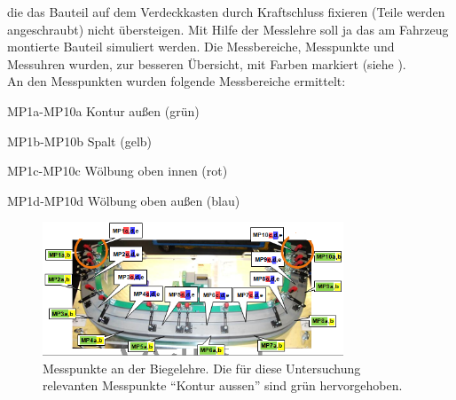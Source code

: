 \documentclass[12pt,a4paper,parskip,twoside,BCOR5mm,headsepline]{scrartcl}
\begin{document}
 
  die das Bauteil auf dem Verdeckkasten durch Kraftschluss fixieren (Teile werden angeschraubt) nicht übersteigen. Mit Hilfe der Messlehre soll ja das am Fahrzeug montierte Bauteil simuliert werden.  Die Messbereiche, Messpunkte und Messuhren wurden, zur besseren Übersicht, mit Farben markiert (siehe ).  \\
 An den Messpunkten wurden folgende Messbereiche ermittelt:
 \begin{description*}
 \item[MP1a-MP10a] Kontur außen (grün)
 \item[MP1b-MP10b] Spalt (gelb)
 \item[MP1c-MP10c] Wölbung oben innen (rot)
 \item[MP1d-MP10d] Wölbung oben außen (blau)
 \end{description*}
\begin{figure}[hbtp]
\centering
\includegraphics[width=0.8\textwidth]{messpunktevdkda3}
\caption{Messpunkte an der Biegelehre. Die für diese Untersuchung relevanten Messpunkte "`Kontur aussen"' sind grün hervorgehoben.}
\label{fig:messpunktevdkda3}
\end{figure} 
 
 
 
\end{document}
